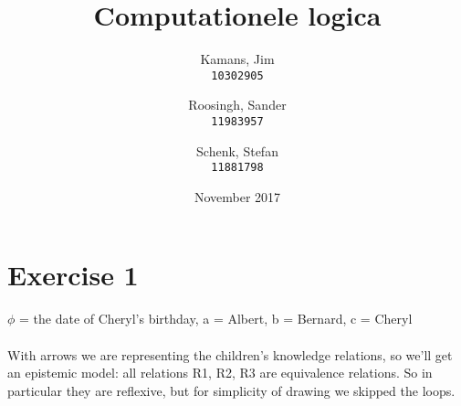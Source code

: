 \documentclass[leqno]{article}
\title{Computationele logica}
\author{
    Kamans, Jim\\
    \texttt{10302905}
    \and
    Roosingh, Sander\\
    \texttt{11983957}
    \and
    Schenk, Stefan\\
    \texttt{11881798}
}
\date{November 2017}
\begin{document}
\maketitle

\section{Exercise 1}

$\phi$ = the date of Cheryl's birthday, a = Albert, b = Bernard, c = Cheryl \\
\\
With arrows we are representing the children’s knowledge relations, so we’ll get an epistemic model: all relations R1, R2, R3 are equivalence relations. So in particular they are reflexive, but for simplicity of drawing we skipped the loops.
\\
\end{document}
